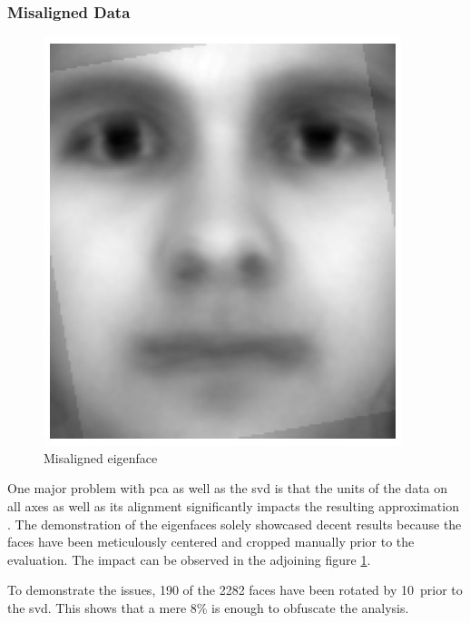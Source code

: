 \subsubsection{Misaligned Data}


\begin{figure}
    \centering
    \includegraphics[width=0.9\linewidth]{external_content/media/rotation/average_face-rotation.png}
    \captionsetup{justification=centering}
    \caption{Misaligned eigenface}
    \label{fig:misalignedEigenface}
\end{figure}

One major problem with \gls{pca} as well as the \gls{svd} is that the units of the data on all axes as well as its alignment significantly impacts the resulting approximation \cite{brunton2019data}.
The demonstration of the eigenfaces solely showcased decent results because the faces have been meticulously centered and cropped manually prior to the evaluation.
The impact can be observed in the adjoining figure \ref{fig:misalignedEigenface}.

To demonstrate the issues, 190 of the 2282 faces have been rotated by 10\textdegree\ prior to the \gls{svd}.
This shows that a mere 8\% is enough to obfuscate the analysis.



